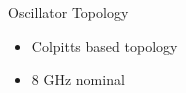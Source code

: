 \documentclass[10pt]{beamer}
\begin{document}
\begin{frame}{Oscillator Topology}

\begin{figure}[h]
\end{figure}

\begin{itemize}
 \item Colpitts based topology
 \item 8 GHz nominal
\end{itemize}

\end{frame}
\end{document}
